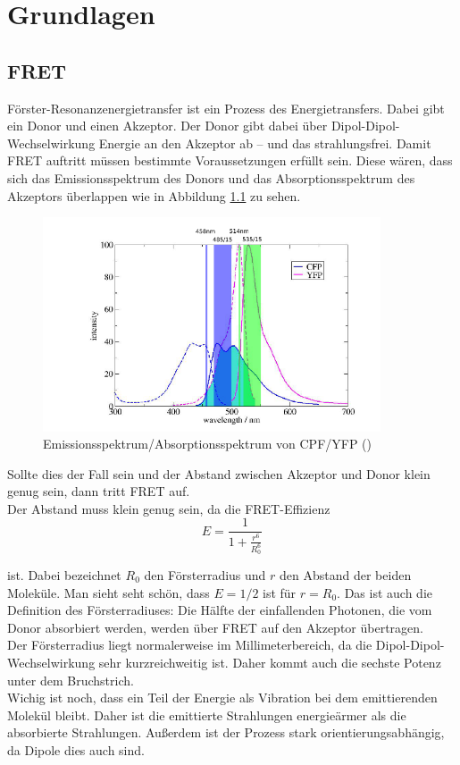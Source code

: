 
\chapter{Grundlagen}

\section{FRET}

Förster-Resonanzenergietransfer ist ein Prozess des Energietransfers. Dabei gibt ein Donor und einen Akzeptor. Der Donor gibt dabei über Dipol-Dipol-Wechselwirkung 
Energie an den Akzeptor ab – und das strahlungsfrei.
Damit FRET auftritt müssen bestimmte Voraussetzungen erfüllt sein. Diese wären, dass sich das Emissionsspektrum des Donors und das Absorptionsspektrum des Akzeptors überlappen wie in  
Abbildung \ref{bild:FRETSpektrum} zu sehen.

\begin{figure}[h]
    \centering
    \includegraphics[width = 10cm]{Bilder/Grundlagen/FRETSpektrum.png}
    \caption{Emissionsspektrum/Absorptionsspektrum von CPF/YFP (\cite{FRETSkript})}
    \label{bild:FRETSpektrum}
\end{figure}

Sollte dies der Fall sein und der Abstand zwischen Akzeptor und Donor klein genug sein, dann tritt FRET auf. \\
Der Abstand muss klein genug sein, da die FRET-Effizienz\\


\begin{equation}
    E = \frac{1}{1+\frac{r^6}{R_0^6}}
\end{equation}

ist. Dabei bezeichnet $R_0$ den Försterradius und $r$ den Abstand der beiden Moleküle. Man sieht seht schön, dass $E = 1/2$ ist für $r = R_0$. Das ist auch die 
Definition des Försterradiuses: Die Hälfte der einfallenden Photonen, die vom Donor absorbiert werden, werden über FRET auf den Akzeptor übertragen.\\
Der Försterradius liegt normalerweise im Millimeterbereich, da die Dipol-Dipol-Wechselwirkung sehr kurzreichweitig ist. Daher kommt auch die sechste Potenz unter dem Bruchstrich.\\
Wichig ist noch, dass ein Teil der Energie als Vibration bei dem emittierenden Molekül bleibt. Daher ist die emittierte Strahlungen energieärmer als die absorbierte Strahlungen. Außerdem 
ist der Prozess stark orientierungsabhängig, da Dipole dies auch sind.


